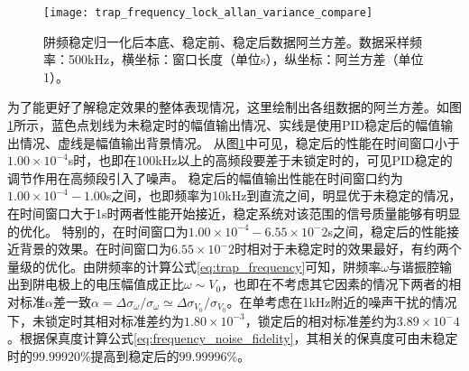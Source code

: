 \begin{figure}
    \centering
    \caption[阱频稳定归一化后本底、稳定前、稳定后数据阿兰方差。]{阱频稳定归一化后本底、稳定前、稳定后数据阿兰方差。数据采样频率：500kHz，横坐标：窗口长度（单位s），纵坐标：阿兰方差（单位1）。\label{fig:trap_frequency_lock_allan_variance_compare}}
    \texttt{[image: trap\_frequency\_lock\_allan\_variance\_compare]}
\end{figure}


为了能更好了解稳定效果的整体表现情况，这里绘制出各组数据的阿兰方差。如图\ref{fig:trap_frequency_lock_allan_variance_compare}所示，蓝色点划线为未稳定时的幅值输出情况、实线是使用PID稳定后的幅值输出情况、虚线是幅值输出背景情况。
从图\ref{fig:trap_frequency_lock_allan_variance_compare}中可见，稳定后的性能在时间窗口小于$1.00\times 10^{-4}$s时，也即在100kHz以上的高频段要差于未锁定时的，可见PID稳定的调节作用在高频段引入了噪声。
稳定后的幅值输出性能在时间窗口约为$1.00\times 10^{-4}-1.00$s之间，也即频率为10kHz到直流之间，明显优于未稳定的情况，在时间窗口大于1s时两者性能开始接近，稳定系统对该范围的信号质量能够有明显的优化。
特别的，在时间窗口为$1.00\times 10^{-4}-6.55\times 10^-2$s之间，稳定后的性能接近背景的效果。在时间窗口为$6.55\times 10^-2$时相对于未稳定时的效果最好，有约两个量级的优化。由阱频率的计算公式\eqref{eq:trap_frequency}可知，阱频率$\omega$与谐振腔输出到阱电极上的电压幅值成正比$\omega\sim V_0$，也即在不考虑其它因素的情况下两者的相对标准$\alpha$差一致$\alpha=\Delta\sigma_{\omega}/\sigma_{\omega}\simeq\Delta\sigma_{V_0}/\sigma_{V_0}$。在单考虑在1kHz附近的噪声干扰的情况下，未锁定时其相对标准差约为$1.80\times10^{-3}$，锁定后的相对标准差约为$3.89\times10^-4$。根据保真度计算公式\eqref{eq:frequency_noise_fidelity}，其相关的保真度可由未稳定时的$99.99920\%$提高到稳定后的$99.99996\%$。








